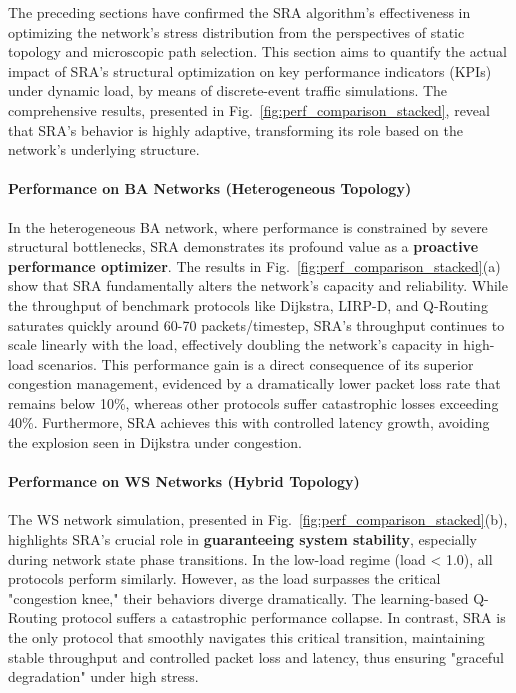 \documentclass[journal]{IEEEtran}
\begin{document}
The preceding sections have confirmed the SRA algorithm's effectiveness in optimizing the network's stress distribution from the perspectives of static topology and microscopic path selection. This section aims to quantify the actual impact of SRA's structural optimization on key performance indicators (KPIs) under dynamic load, by means of discrete-event traffic simulations. The comprehensive results, presented in Fig.~\ref{fig:perf_comparison_stacked}, reveal that SRA's behavior is highly adaptive, transforming its role based on the network's underlying structure.

\paragraph{Performance on BA Networks (Heterogeneous Topology)}
In the heterogeneous BA network, where performance is constrained by severe structural bottlenecks, SRA demonstrates its profound value as a \textbf{proactive performance optimizer}. The results in Fig.~\ref{fig:perf_comparison_stacked}(a) show that SRA fundamentally alters the network's capacity and reliability. While the throughput of benchmark protocols like Dijkstra, LIRP-D, and Q-Routing saturates quickly around 60-70 packets/timestep, SRA's throughput continues to scale linearly with the load, effectively doubling the network's capacity in high-load scenarios. This performance gain is a direct consequence of its superior congestion management, evidenced by a dramatically lower packet loss rate that remains below 10\%, whereas other protocols suffer catastrophic losses exceeding 40\%. Furthermore, SRA achieves this with controlled latency growth, avoiding the explosion seen in Dijkstra under congestion.

\paragraph{Performance on WS Networks (Hybrid Topology)}
The WS network simulation, presented in Fig.~\ref{fig:perf_comparison_stacked}(b), highlights SRA's crucial role in \textbf{guaranteeing system stability}, especially during network state phase transitions. In the low-load regime (load < 1.0), all protocols perform similarly. However, as the load surpasses the critical "congestion knee," their behaviors diverge dramatically. The learning-based Q-Routing protocol suffers a catastrophic performance collapse. In contrast, SRA is the only protocol that smoothly navigates this critical transition, maintaining stable throughput and controlled packet loss and latency, thus ensuring "graceful degradation" under high stress.
\end{document}
